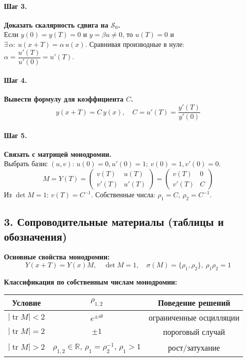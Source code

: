 \paragraph{Шаг 3.} \textbf{Доказать скалярность сдвига на \(\mathcal S_0\).}\\
Если \(y(0)=y(T)=0\) и \(y=\beta u\neq0\), то \(u(T)=0\) и \(\exists\,\alpha:\ u(x+T)=\alpha\,u(x)\).
Сравнивая производные в нуле: \(\alpha=\dfrac{u'(T)}{u'(0)}=u'(T)\).

\paragraph{Шаг 4.} \textbf{Вывести формулу для коэффициента \(C\).}\\
\[
\boxed{\,y(x+T)=C\,y(x),\quad C=u'(T)=\dfrac{y'(T)}{y'(0)}\,}
\]

\paragraph{Шаг 5.} \textbf{Связать с матрицей монодромии.}\\
Выбрать базис \((u,v)\): \(u(0)=0,u'(0)=1;\ v(0)=1,v'(0)=0\).
\[
M=Y(T)=\begin{pmatrix}v(T)&u(T)\\ v'(T)&u'(T)\end{pmatrix}
=\begin{pmatrix}v(T)&0\\ v'(T)&C\end{pmatrix}
\]
Из \(\det M=1\): \(v(T)=C^{-1}\).
Собственные числа: \(\rho_1=C,\ \rho_2=C^{-1}\).

\subsection*{3. Сопроводительные материалы (таблицы и обозначения)}

\textbf{Основные свойства монодромии:}
\[
Y(x+T)=Y(x)M,\quad \det M=1,\quad \sigma(M)=\{\rho_1,\rho_2\},\ \rho_1\rho_2=1
\]

\textbf{Классификация по собственным числам монодромии:}
\begin{center}
\begin{tabular}{|c|c|c|}
\hline
\textbf{Условие} & \(\rho_{1,2}\) & \textbf{Поведение решений} \\ \hline
\(|\operatorname{tr}M|<2\) & \(e^{\pm i\theta}\) & ограниченные осцилляции \\ \hline
\(|\operatorname{tr}M|=2\) & \(\pm1\) & пороговый случай \\ \hline
\(|\operatorname{tr}M|>2\) & \(\rho_{1,2}\in\mathbb R\), \(\rho_1=\rho_2^{-1}\), \(\rho_1>1\) & рост/затухание \\ \hline
\end{tabular}
\end{center}

